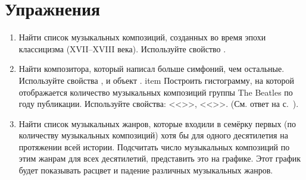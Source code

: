 \section{Упражнения}
\begin{enumerate}
    \item Найти список музыкальных композиций, созданных во время эпохи классицизма (XVII--XVIII века).
Используйте свойство .
    \item Найти композитора, который написал больше симфоний, чем остальные. 
    Используйте свойства , 
        и объект .
    item Построить гистограмму, на которой отображается количество музыкальных композиций 
        группы The Beatles по году публикации.
        Используйте свойства: <<>>, <<>>. 
%        
        \label{question:TheBeatles_quest}
        (См. ответ %
         на с.~\pageref{answer:TheBeatles_answ}).

     \item Найти список музыкальных жанров, которые входили в семёрку первых 
         (по количеству музыкальных композиций) хотя бы для одного 
         десятилетия на протяжении всей истории. 
         Подсчитать число музыкальных композиций по этим жанрам для всех десятилетий, 
         представить это на графике. 
         Этот график будет показывать расцвет и падение различных музыкальных жанров. 
\end{enumerate}
